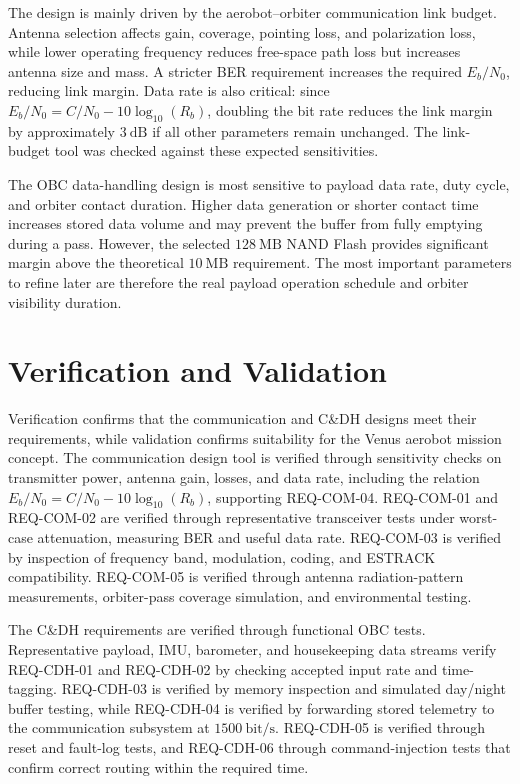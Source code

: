 The design is mainly driven by the aerobot--orbiter communication link budget. Antenna selection affects gain, coverage, pointing loss, and polarization loss, while lower operating frequency reduces free-space path loss but increases antenna size and mass. A stricter BER requirement increases the required \(E_b/N_0\), reducing link margin. Data rate is also critical: since \(E_b/N_0 = C/N_0 - 10\log_{10}(R_b)\), doubling the bit rate reduces the link margin by approximately \(3~\mathrm{dB}\) if all other parameters remain unchanged. The link-budget tool was checked against these expected sensitivities.

The OBC data-handling design is most sensitive to payload data rate, duty cycle, and orbiter contact duration. Higher data generation or shorter contact time increases stored data volume and may prevent the buffer from fully emptying during a pass. However, the selected \(128~\mathrm{MB}\) NAND Flash provides significant margin above the theoretical \(10~\mathrm{MB}\) requirement. The most important parameters to refine later are therefore the real payload operation schedule and orbiter visibility duration.

\section{Verification and Validation}

Verification confirms that the communication and C\&DH designs meet their requirements, while validation confirms suitability for the Venus aerobot mission concept. The communication design tool is verified through sensitivity checks on transmitter power, antenna gain, losses, and data rate, including the relation \(E_b/N_0 = C/N_0 - 10\log_{10}(R_b)\), supporting REQ-COM-04. REQ-COM-01 and REQ-COM-02 are verified through representative transceiver tests under worst-case attenuation, measuring BER and useful data rate. REQ-COM-03 is verified by inspection of frequency band, modulation, coding, and ESTRACK compatibility. REQ-COM-05 is verified through antenna radiation-pattern measurements, orbiter-pass coverage simulation, and environmental testing.

The C\&DH requirements are verified through functional OBC tests. Representative payload, IMU, barometer, and housekeeping data streams verify REQ-CDH-01 and REQ-CDH-02 by checking accepted input rate and time-tagging. REQ-CDH-03 is verified by memory inspection and simulated day/night buffer testing, while REQ-CDH-04 is verified by forwarding stored telemetry to the communication subsystem at \(1500~\mathrm{bit/s}\). REQ-CDH-05 is verified through reset and fault-log tests, and REQ-CDH-06 through command-injection tests that confirm correct routing within the required time.

